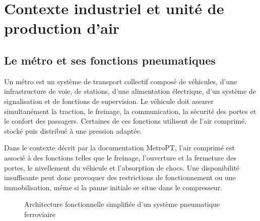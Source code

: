 \chapter{Contexte industriel et unité de production d'air}

\section{Le métro et ses fonctions pneumatiques}
Un métro est un système de transport collectif composé de véhicules, d'une infrastructure de voie, de stations, d'une alimentation électrique, d'un système de signalisation et de fonctions de supervision. Le véhicule doit assurer simultanément la traction, le freinage, la communication, la sécurité des portes et le confort des passagers. Certaines de ces fonctions utilisent de l'air comprimé, stocké puis distribué à une pression adaptée.

Dans le contexte décrit par la documentation MetroPT, l'air comprimé est associé à des fonctions telles que le freinage, l'ouverture et la fermeture des portes, le nivellement du véhicule et l'absorption de chocs. Une disponibilité insuffisante peut donc provoquer des restrictions de fonctionnement ou une immobilisation, même si la panne initiale se situe dans le compresseur.

\begin{figure}[H]
\centering
{}
\caption{Architecture fonctionnelle simplifiée d'un système pneumatique ferroviaire}
\label{fig:rail-pneumatic-architecture}
\end{figure}

